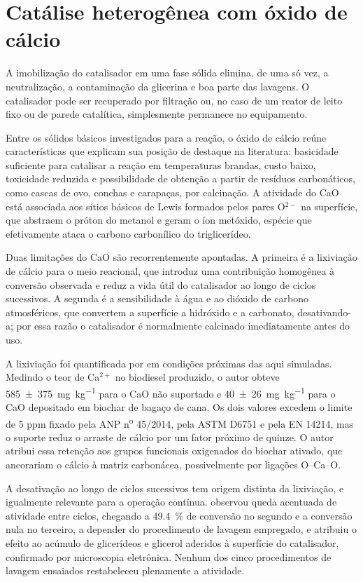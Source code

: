 \section{Catálise heterogênea com óxido de cálcio}
\label{sec:cao}

A imobilização do catalisador em uma fase sólida elimina, de uma só vez, a
neutralização, a contaminação da glicerina e boa parte das lavagens. O
catalisador pode ser recuperado por filtração ou, no caso de um reator de leito
fixo ou de parede catalítica, simplesmente permanece no equipamento.

Entre os sólidos básicos investigados para a reação, o óxido de cálcio reúne
características que explicam sua posição de destaque na literatura: basicidade
suficiente para catalisar a reação em temperaturas brandas, custo baixo,
toxicidade reduzida e possibilidade de obtenção a partir de resíduos
carbonáticos, como cascas de ovo, conchas e carapaças, por calcinação. A
atividade do CaO está associada aos sítios básicos de Lewis formados pelos
pares O$^{2-}$ na superfície, que abstraem o próton do metanol e geram o íon
metóxido, espécie que efetivamente ataca o carbono carbonílico do
triglicerídeo.

Duas limitações do CaO são recorrentemente apontadas. A primeira é a lixiviação
de cálcio para o meio reacional, que introduz uma contribuição homogênea à
conversão observada e reduz a vida útil do catalisador ao longo de ciclos
sucessivos. A segunda é a sensibilidade à água e ao dióxido de carbono
atmosféricos, que convertem a superfície a hidróxido e a carbonato,
desativando-a; por essa razão o catalisador é normalmente calcinado
imediatamente antes do uso.

A lixiviação foi quantificada por \textcite{Melo2023} em condições próximas das
aqui simuladas. Medindo o teor de Ca$^{2+}$ no biodiesel produzido, o autor
obteve \SI{585(375)}{\milli\gram\per\kilogram} para o CaO não suportado e
\SI{40(26)}{\milli\gram\per\kilogram} para o CaO depositado em biochar de bagaço
de cana. Os dois valores excedem o limite de \num{5} ppm fixado pela
ANP n\textsuperscript{o} 45/2014, pela ASTM D6751 e pela EN 14214, mas o suporte
reduz o arraste de cálcio por um fator próximo de quinze. O autor atribui essa
retenção aos grupos funcionais oxigenados do biochar ativado, que ancorariam o
cálcio à matriz carbonácea, possivelmente por ligações O--Ca--O.

A desativação ao longo de ciclos sucessivos tem origem distinta da lixiviação, e
igualmente relevante para a operação contínua. \textcite{Melo2023} observou
queda acentuada de atividade entre ciclos, chegando a \SI{49.4}{\percent} de
conversão no segundo e a conversão nula no terceiro, a depender do procedimento
de lavagem empregado, e atribuiu o efeito ao acúmulo de glicerídeos e glicerol
aderidos à superfície do catalisador, confirmado por microscopia eletrônica.
Nenhum dos cinco procedimentos de lavagem ensaiados restabeleceu plenamente a
atividade.

